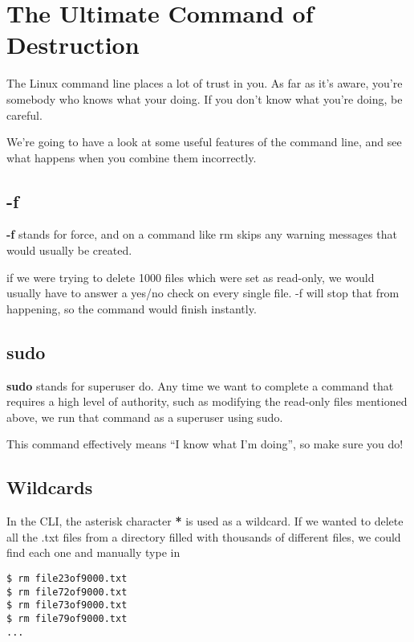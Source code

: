 \section{The Ultimate Command of Destruction}

	The Linux command line places a lot of trust in you. As far as it's aware, you're somebody who knows what your doing. If you don't know what you're doing, be careful.
	
	We're going to have a look at some useful features of the command line, and see what happens when you combine them incorrectly.
		
	\subsection*{-f}
	
		\textbf{-f} stands for force, and on a command like rm skips any warning messages that would usually be created.
		
		if we were trying to delete 1000 files which were set as read-only, we would usually have to answer a yes/no check on every single file. -f will stop that from happening, so the command would finish instantly.
	
	\subsection*{sudo}
	
		\textbf{sudo} stands for superuser do. Any time we want to complete a command that requires a high level of authority, such as modifying the read-only files mentioned above, we run that command as a superuser using sudo.
		
		This command effectively means ``I know what I'm doing'', so make sure you do!
	
	\subsection*{Wildcards}
	
		In the CLI, the asterisk character \textbf{*} is used as a wildcard. If we wanted to delete all the .txt files from a directory filled with thousands of different files, we could find each one and manually type in
	
		\begin{lstlisting}[style=Terminal]
$ rm file23of9000.txt
$ rm file72of9000.txt
$ rm file73of9000.txt
$ rm file79of9000.txt
...
		\end{lstlisting}

